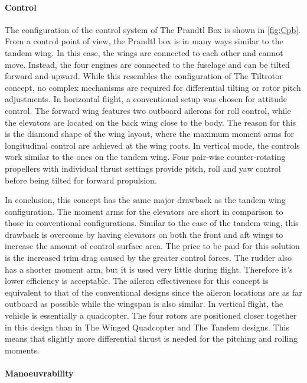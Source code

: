 \paragraph{Control}

The configuration of the control system of The Prandtl Box is shown in \autoref{fig:Cpb}.
From a control point of view, the Prandtl box is in many ways similar to the tandem wing. In this case, the wings are connected to each other and cannot move. Instead, the four engines are connected to the fuselage and can be tilted forward and upward. While this resembles the configuration of The Tiltrotor concept, no complex mechanisms are required for differential tilting or rotor pitch adjustments. In horizontal flight, a conventional setup was chosen for attitude control. The forward wing features two outboard ailerons for roll control, while the elevators are located on the back wing close to the body. The reason for this is the diamond shape of the wing layout, where the maximum moment arms for longitudinal control are achieved at the wing roots.
In vertical mode, the controls work similar to the ones on the tandem wing. Four pair-wise counter-rotating propellers with individual thrust settings provide pitch, roll and yaw control before being tilted for forward propulsion.

In conclusion, this concept has the same major drawback as the tandem wing configuration. The moment arms for the elevators are short in comparison to those in conventional configurations. Similar to the case of the tandem wing, this drawback is overcome by having elevators on both the front and aft wings to increase the amount of control surface area. The price to be paid for this solution is the increased trim drag caused by the greater control forces. The rudder also has a shorter moment arm, but it is used very little during flight. Therefore it's lower efficiency is acceptable. The aileron effectiveness for this concept is equivalent to that of the conventional designs since the aileron locations are as far outboard as possible while the wingspan is also similar. In vertical flight, the vehicle is essentially a quadcopter. The four rotors are positioned closer together in this design than in The Winged Quadcopter and The Tandem designs. This means that slightly more differential thrust is needed for the pitching and rolling moments. 

\paragraph{Manoeuvrability}

